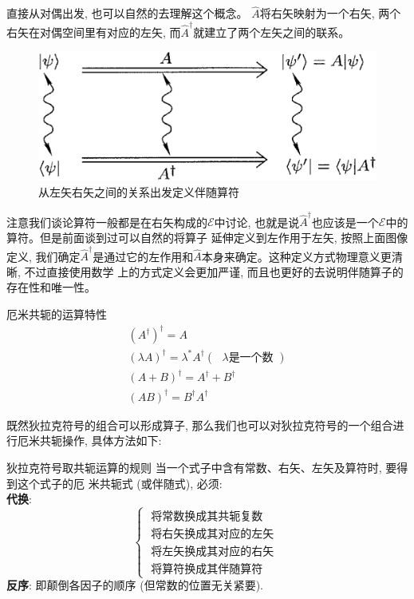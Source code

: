 直接从对偶出发, 也可以自然的去理解这个概念。 $\hat A$将右矢映射为一个右矢, 两个右矢在对偶空间里有对应的左矢, 而$\hat{A}^\dagger$就建立了两个左矢之间的联系。
\begin{figure}[htbp]
    \centering
    \includegraphics[scale=0.4]{fig/b-1.eps}
    \caption{从左矢右矢之间的关系出发定义伴随算符}
\end{figure}
\begin{thinknote}
    注意我们谈论算符一般都是在右矢构成的$\mathscr{E}$中讨论, 也就是说$\hat{A}^\dagger$也应该是一个$\mathscr{E}$中的算符。但是前面谈到过可以自然的将算子
    延伸定义到左作用于左矢, 按照上面图像定义, 我们确定$\hat{A}^\dagger$是通过它的左作用和$\hat{A}$本身来确定。这种定义方式物理意义更清晰, 不过直接使用数学
    上的方式定义会更加严谨, 而且也更好的去说明伴随算子的存在性和唯一性。
\end{thinknote}
\begin{proposition}{厄米共轭的运算特性}
    \begin{equation}
        \begin{gathered}
        \left(A^{\dagger}\right)^{\dagger}=A \\
        (\lambda A)^{\dagger}=\lambda^{*} A^{\dagger}( \text { $\lambda$是一个数 }) \\
        (A+B)^{\dagger}=A^{\dagger}+B^{\dagger}\\
        \boxed{(AB)^{\dagger}=B^{\dagger}A^{\dagger}}
        \end{gathered}
    \end{equation}
\end{proposition}
既然狄拉克符号的组合可以形成算子, 那么我们也可以对狄拉克符号的一个组合进行厄米共轭操作, 具体方法如下:
\begin{theorem}{狄拉克符号取共轭运算的规则}
    当一个式子中含有常数、右矢、左矢及算符时, 要得到这个式子的厄 米共轭式 (或伴随式), 必须:\\
\textbf{代换}:
$$\left\{\begin{array}{l}\text { 将常数换成其共轭复数 } \\ \text { 将右矢换成其对应的左矢 } \\ \text { 将左矢换成其对应的右矢 } \\ \text { 将算符换成其伴随算符 }\end{array}\right.$$
\textbf{反序}: 即颠倒各因子的顺序 (但常数的位置无关紧要).
\end{theorem}
